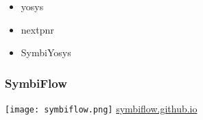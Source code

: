 \documentclass{beamer}
\begin{document}
\begin{frame}
\begin{minipage}[t]{.49\linewidth}
\begin{itemize}
  \item yosys
  \href{https://github.com/YosysHQ/yosys}{\faGithub}
  \href{http://www.clifford.at/yosys/}{\faGlobe}

  \item nextpnr
  \href{https://github.com/YosysHQ/nextpnr}{\faGithub}

  \item SymbiYosys
  \href{https://github.com/YosysHQ/SymbiYosys}{\faGithub}
  \href{https://symbiyosys.rtfd.io}{\faBook}
\end{itemize}
\end{minipage}
\end{frame}

\begin{frame}
\frametitle{SymbiFlow}
\centering
\texttt{[image: symbiflow.png]}
\vfill
\Large\href{https://symbiflow.github.io/}{symbiflow.github.io}
\end{frame}
\end{document}
